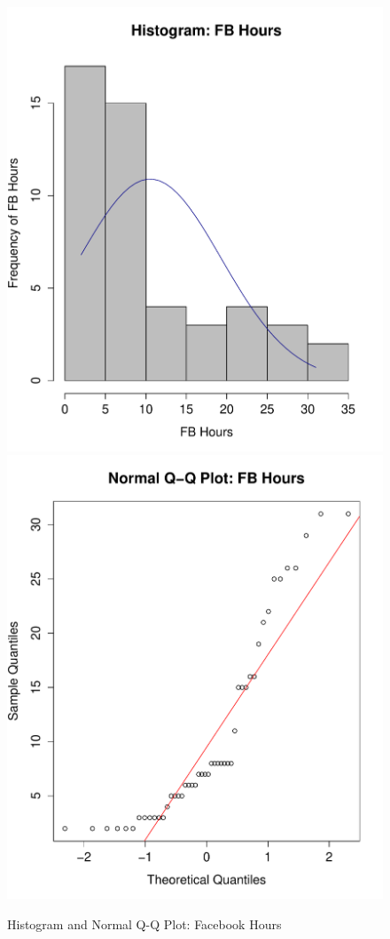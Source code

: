 \begin{figure}[H]
\caption{Histogram and Normal Q-Q Plot: Facebook Hours}
\centering
\includegraphics[scale=0.35]{./img/hist_fbhours.pdf}
\includegraphics[scale=0.35]{./img/qqplot_fbhours.pdf}
\end{figure}

